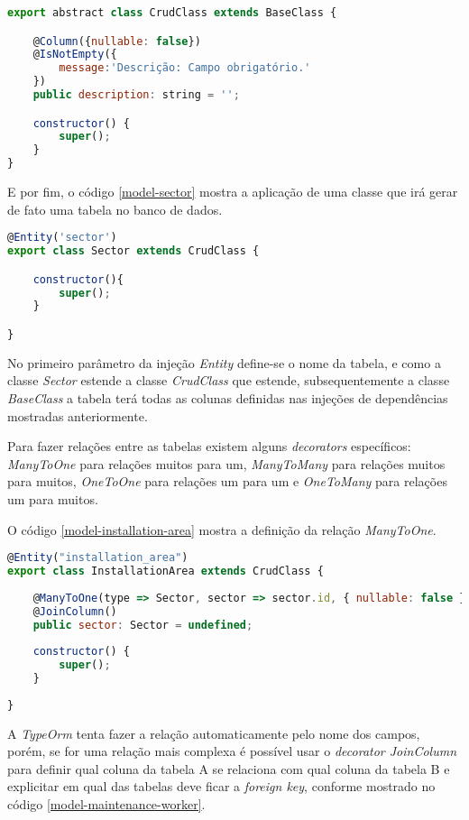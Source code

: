 \begin{lstlisting}[language=JavaScript, caption={CrudClass: Mapeamento de propriedades para CRUDs genéricos}, label={typeorm-crud-class}]
export abstract class CrudClass extends BaseClass {

	@Column({nullable: false})
	@IsNotEmpty({
		message:'Descrição: Campo obrigatório.'
	})
	public description: string = '';

	constructor() {
		super();
	}
}
\end{lstlisting}

E por fim, o código \ref{model-sector} mostra a aplicação de uma classe que irá gerar de fato uma tabela no banco de dados.

\begin{lstlisting}[language=JavaScript, caption={Mapeamento de propriedades da tabela sector}, label={model-sector}]
@Entity('sector')
export class Sector extends CrudClass {

	constructor(){
		super();
	}

}
\end{lstlisting}

No primeiro parâmetro da injeção \textit{Entity} define-se o nome da tabela, e como a classe \textit{Sector} estende a classe \textit{CrudClass} que estende, subsequentemente a classe \textit{BaseClass} a tabela terá todas as colunas definidas nas injeções de dependências mostradas anteriormente.

Para fazer relações entre as tabelas existem alguns \textit{decorators} específicos: \textit{ManyToOne} para relações muitos para um, \textit{ManyToMany} para relações muitos para muitos, \textit{OneToOne} para relações um para um e \textit{OneToMany} para relações um para muitos.

O código \ref{model-installation-area} mostra a definição da relação \textit{ManyToOne}.

\begin{lstlisting}[language=JavaScript, caption={Mapeamento de propriedades da tabela área de installation\_area}, label={model-installation-area}]
@Entity("installation_area")
export class InstallationArea extends CrudClass {
	
	@ManyToOne(type => Sector, sector => sector.id, { nullable: false })
	@JoinColumn()
	public sector: Sector = undefined;
	
	constructor() {
		super();
	}
	
}
\end{lstlisting}

A \textit{TypeOrm} tenta fazer a relação automaticamente pelo nome dos campos, porém, se for uma relação mais complexa é possível usar o \textit{decorator JoinColumn} para definir qual coluna da tabela A se relaciona com qual coluna da tabela B e explicitar em qual das tabelas deve ficar a \textit{foreign key}, conforme mostrado no código \ref{model-maintenance-worker}.

